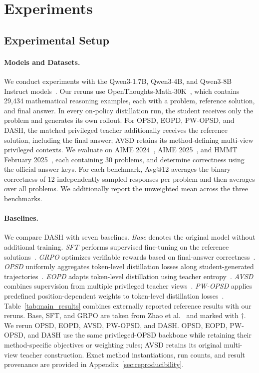 \documentclass[letterpaper]{article} %
\begin{document}
\section{Experiments}

\subsection{Experimental Setup}
\label{sec:experimental_setup}

\paragraph{Models and Datasets.}
We conduct experiments with the Qwen3-1.7B, Qwen3-4B, and Qwen3-8B Instruct models~\cite{yang2025qwen3}. Our reruns use OpenThoughts-Math-30K~\cite{guha2025openthoughts}, which contains 29,434 mathematical reasoning examples, each with a problem, reference solution, and final answer. In every on-policy distillation run, the student receives only the problem and generates its own rollout. For OPSD, EOPD, PW-OPSD, and DASH, the matched privileged teacher additionally receives the reference solution, including the final answer; AVSD retains its method-defining multi-view privileged contexts. We evaluate on AIME 2024~\cite{aime2024}, AIME 2025~\cite{aime2025}, and HMMT February 2025~\cite{hmmt2025feb}, each containing 30 problems, and determine correctness using the official answer keys. For each benchmark, Avg@12 averages the binary correctness of 12 independently sampled responses per problem and then averages over all problems. We additionally report the unweighted mean across the three benchmarks.


\paragraph{Baselines.}

We compare DASH with seven baselines. \emph{Base} denotes the original model without additional training. \emph{SFT} performs supervised fine-tuning on the reference solutions~\cite{ouyang2022instructgpt}. \emph{GRPO} optimizes verifiable rewards based on final-answer correctness~\cite{shao2024deepseekmath}. \emph{OPSD} uniformly aggregates token-level distillation losses along student-generated trajectories~\cite{zhao2026selfdistilled}. \emph{EOPD} adapts token-level distillation using teacher entropy~\cite{jin2026eopd}. \emph{AVSD} combines supervision from multiple privileged teacher views~\cite{nguyen2026avsd}. \emph{PW-OPSD} applies predefined position-dependent weights to token-level distillation losses~\cite{liu2026pwopsd}. Table~\ref{tab:main_results} combines externally reported reference results with our reruns. Base, SFT, and GRPO are taken from Zhao et al.~\cite{zhao2026selfdistilled} and marked with $\dagger$. We rerun OPSD, EOPD, AVSD, PW-OPSD, and DASH. OPSD, EOPD, PW-OPSD, and DASH use the same privileged-OPSD backbone while retaining their method-specific objectives or weighting rules; AVSD retains its original multi-view teacher construction. Exact method instantiations, run counts, and result provenance are provided in Appendix~\ref{sec:reproducibility}.
\end{document}
